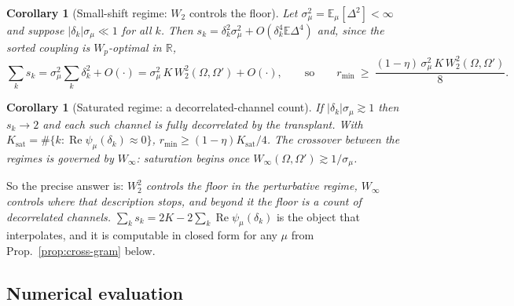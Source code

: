 \documentclass[11pt]{article}
\newtheorem{corollary}[theorem]{Corollary}
\theoremstyle{definition}
\newcommand{\R}{\mathbb{R}}
\newcommand{\E}{\mathbb{E}}
\begin{document}
\begin{corollary}[Small-shift regime: $W_2$ controls the floor]\label{cor:W2}
Let $\sigma_\mu^2=\E_\mu[\Delta^2]<\infty$ and suppose $|\delta_k|\sigma_\mu\ll1$ for all $k$. Then
$s_k=\delta_k^2\sigma_\mu^2+O(\delta_k^4\E\Delta^4)$ and, since the sorted coupling is
$W_p$-optimal in $\R$,
\begin{equation}
\sum_k s_k=\sigma_\mu^2\sum_k\delta_k^2+O(\cdot)=\sigma_\mu^2\,K\,W_2^2(\Omega,\Omega')+O(\cdot),
\qquad\text{so}\qquad
r_{\min}\ \ge\ \frac{(1-\eta)\,\sigma_\mu^2\,K\,W_2^2(\Omega,\Omega')}{8}.
\end{equation}
\end{corollary}

\begin{corollary}[Saturated regime: a decorrelated-channel count]\label{cor:sat}
If $|\delta_k|\sigma_\mu\gtrsim1$ then $s_k\to2$ and each such channel is fully decorrelated by the
transplant. With $K_{\mathrm{sat}}=\#\{k:\operatorname{Re}\psi_\mu(\delta_k)\approx0\}$,
$r_{\min}\ge(1-\eta)K_{\mathrm{sat}}/4$. The crossover between the regimes is governed by $W_\infty$:
saturation begins once $W_\infty(\Omega,\Omega')\gtrsim1/\sigma_\mu$.
\end{corollary}

So the precise answer is: \emph{$W_2^2$ controls the floor in the perturbative regime, $W_\infty$
controls where that description stops, and beyond it the floor is a count of decorrelated channels.}
$\sum_ks_k=2K-2\sum_k\operatorname{Re}\psi_\mu(\delta_k)$ is the object that interpolates, and it is
computable in closed form for any $\mu$ from Prop.~\ref{prop:cross-gram} below.

\subsection{Numerical evaluation}
\end{document}
